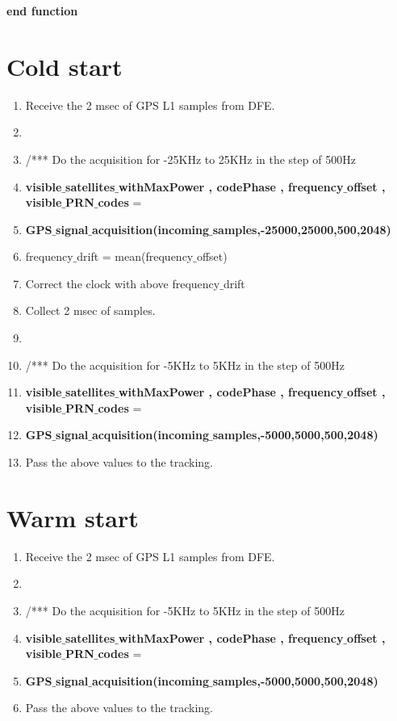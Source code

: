 \documentclass[journal,10pt,onecolumn]{article}
\begin{document}
\textbf{end function}  












\section{Cold start}
\begin{enumerate}
    \item Receive the 2 msec of GPS L1 samples from DFE.
    \item[]
    \item[] /*** Do the acquisition for -25KHz to 25KHz in the step of 500Hz
    \item \textbf{visible$\_$satellites$\_$withMaxPower , codePhase , frequency$\_$offset , visible$\_$PRN$\_$codes}  =  
    \item[] \textbf{GPS$\_$signal$\_$acquisition(incoming$\_$samples,-25000,25000,500,2048)}  
    \item frequency$\_$drift = mean(frequency$\_$offset)
    \item Correct the clock with above frequency$\_$drift
    \item Collect 2 msec of samples.
    \item []
    \item[] /*** Do the acquisition for -5KHz to 5KHz in the step of 500Hz
    \item \textbf{visible$\_$satellites$\_$withMaxPower , codePhase , frequency$\_$offset , visible$\_$PRN$\_$codes}  =  
    \item[] \textbf{GPS$\_$signal$\_$acquisition(incoming$\_$samples,-5000,5000,500,2048)} 
    \item Pass the above values to the tracking.
\end{enumerate}


\section{Warm start}
\begin{enumerate}
    \item Receive the 2 msec of GPS L1 samples from DFE.
    \item []
    \item[] /*** Do the acquisition for -5KHz to 5KHz in the step of 500Hz
    \item \textbf{visible$\_$satellites$\_$withMaxPower , codePhase , frequency$\_$offset , visible$\_$PRN$\_$codes}  =  
    \item[] \textbf{GPS$\_$signal$\_$acquisition(incoming$\_$samples,-5000,5000,500,2048)}  
    \item  Pass the above values to the tracking.
\end{enumerate}
\end{document}
